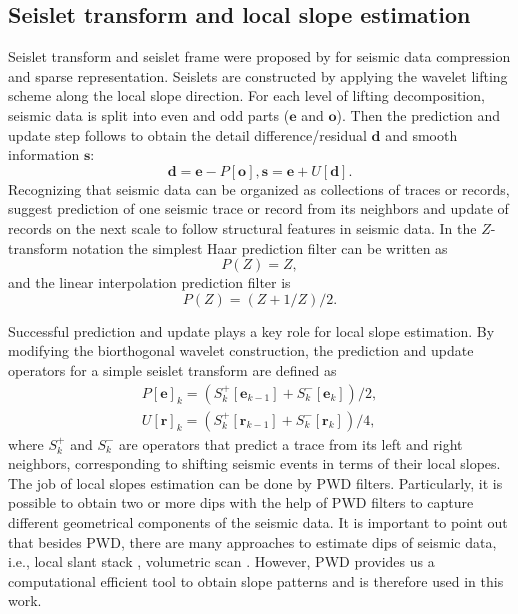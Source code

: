 \subsection{Seislet transform and local slope estimation}

Seislet transform and seislet frame were proposed by \cite{fomel2010seislet} for seismic data compression and sparse representation. Seislets are constructed by applying the wavelet lifting scheme \citep{sweldens1998lifting} along the local slope direction. For each level of lifting decomposition, seismic data is split into even and odd parts ($\mathbf{e}$ and $\mathbf{o}$). Then the prediction and update step follows to obtain the detail difference/residual $\mathbf{d}$ and smooth information $\mathbf{s}$:
\begin{equation}
\mathbf{d}=\mathbf{e}-P[\mathbf{o}],\mathbf{s}=\mathbf{e}+U[\mathbf{d}].
\end{equation}
Recognizing that seismic data can be organized as collections of traces or records, \cite{fomel2010seislet} suggest prediction of one seismic trace or record from its neighbors and update of records on the next scale to follow structural features in seismic data. In the $Z$-transform notation the simplest Haar prediction filter can be written as
\begin{equation}
 P(Z)=Z,
\end{equation}
and the linear interpolation prediction filter is
\begin{equation}
 P(Z)=(Z+1/Z)/2.
\end{equation}

Successful prediction and update plays a key role for local slope estimation. By modifying the biorthogonal wavelet construction, the prediction and update operators for a simple seislet transform are defined as
\begin{equation}
\begin{split}
 P[\mathbf{e}]_k=(S_k^{+}[\mathbf{e}_{k-1}] + S_{k}^{-} [\mathbf{e}_k]) /2,\\
 U[\mathbf{r}]_k=(S_k^{+}[\mathbf{r}_{k-1}] + S_{k}^{-} [\mathbf{r}_k]) /4,
\end{split}
\end{equation}
where $S_k^{+}$ and $S_k^{-}$ are operators that predict a trace from its left and right neighbors, corresponding to shifting seismic events in terms of their local slopes. The job of local slopes estimation can be done by PWD filters. Particularly, it is possible to obtain two or more dips with the help of PWD filters to capture different geometrical components of the seismic data. It is important to point out that besides PWD, there are many approaches to estimate dips of seismic data, i.e., local slant stack \citep{ottolini1983signal}, volumetric scan \citep{marfurt2006robust}. However, PWD provides us a computational efficient tool to obtain slope patterns and is therefore used in this work.



